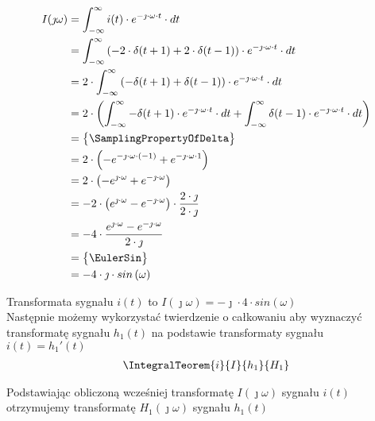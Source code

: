 \begin{task}
\begin{align*}
I(\jmath \omega )&=\int_{-\infty }^{\infty}i(t) \cdot e^{-\jmath \cdot \omega \cdot t}\cdot dt\\
&=\int_{-\infty }^{\infty}\left( -2 \cdot \delta(t+1) + 2 \cdot \delta(t-1)\right) \cdot e^{-\jmath \cdot \omega \cdot t}\cdot dt\\
&=2 \cdot \int_{-\infty }^{\infty} \left( -\delta(t+1) + \delta(t-1) \right) \cdot e^{-\jmath \cdot \omega \cdot t}\cdot dt\\
&=2 \cdot \left( \int_{-\infty }^{\infty} -\delta(t+1) \cdot e^{-\jmath \cdot \omega \cdot t}\cdot dt + \int_{-\infty }^{\infty} \delta(t-1) \cdot e^{-\jmath \cdot \omega \cdot t}\cdot dt \right)\\
&=\begin{Bmatrix}
\SamplingPropertyOfDelta
\end{Bmatrix}\\
&= 2 \cdot \left( -e^{-\jmath \cdot \omega \cdot (-1)} + e^{-\jmath \cdot \omega \cdot 1} \right)\\
&= 2 \cdot \left( -e^{\jmath \cdot \omega} + e^{-\jmath \cdot \omega} \right)\\
&= -2 \cdot \left( e^{\jmath \cdot \omega} - e^{-\jmath \cdot \omega} \right) \cdot \frac{2 \cdot \jmath}{2 \cdot \jmath}\\
&= -4 \cdot \frac{ e^{\jmath \cdot \omega} - e^{-\jmath \cdot \omega} }{2 \cdot \jmath} \\
&=\begin{Bmatrix}
\EulerSin
\end{Bmatrix}\\
&= -4 \cdot \jmath \cdot sin\left( \omega\right) \\
\end{align*}

Transformata sygnału $i(t)$ to $I(\jmath \omega)=-\jmath \cdot 4 \cdot sin\left( \omega\right)$
\\

Następnie możemy wykorzystać twierdzenie o całkowaniu aby wyznaczyć transformatę sygnału $h_1(t)$ na podstawie transformaty sygnału $i(t)=h_1'(t)$
\begin{align*}
\IntegralTeorem{i}{I}{h_1}{H_1}
\end{align*}

Podstawiając obliczoną wcześniej transformatę $I(\jmath \omega)$ sygnału $i(t)$ otrzymujemy transformatę $H_1(\jmath \omega)$ sygnału $h_1(t)$


\end{task}
